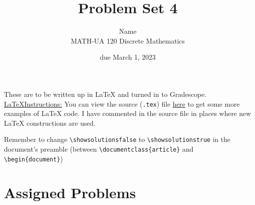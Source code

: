 \documentclass{article}
\title{Problem Set 4}
\author{%
    Name
\\  MATH-UA 120 Discrete Mathematics
}
\date{due March 1, 2023}
\newif\ifshowsolutions
\newcommand{\danger}{\marginpar[\hfill\dbend]{\dbend\hfill}}
\theoremstyle{definition}
\begin{document}
\maketitle



These are to be written up in \LaTeX{} and turned in to Gradescope.\\



\ifshowsolutions
    \SetupExSheets{solution/print=true}
\else
    \danger
 \underline{ \LaTeX  Instructions:}  You can view the source (\texttt{.tex}) file \href{https://bit.ly/3SX4VT4}{here} to get some more examples of \LaTeX{} code.  I have commented in the source file in places where new \LaTeX{} constructions are used.
  
  Remember to change \verb|\showsolutionsfalse| to \verb|\showsolutionstrue|
    in the document's preamble 
    (between \verb|\documentclass{article}| and \verb|\begin{document}|)
\fi

\section*{Assigned Problems}
\end{document}
